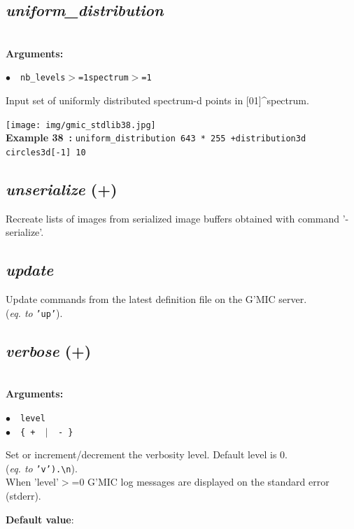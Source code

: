 \documentclass[a4paper,10.5pt,twoside]{book}
\def\comma{\discretionary{,}{}{,}}
\newcommand{\Cb}[1]{\textcolor{cb}{#1}}
\newcommand{\Cc}[1]{\textcolor{cc}{#1}}
\begin{document}
\subsection{\emph{uniform\_distribution} }\vspace*{-0.7em}
~\\\textbf{\Cb{Arguments: }}\begin{flushleft}
{\small \Cb{\hspace*{0.5cm}$\bullet$~~\texttt{nb\_levels$>$=1{\comma}spectrum$>$=1}}}\end{flushleft}
Input set of uniformly distributed spectrum-d points in [0{\comma}1]\textasciicircum spectrum.
\begin{center}\texttt{[image: img/gmic\_stdlib38.jpg]}\\
{\footnotesize \textbf{Example 38~:} \texttt{uniform\_distribution 64{\comma}3 * 255 +distribution3d circles3d[-1] 10}}
\end{center}

\subsection{\emph{unserialize} (+)}\vspace*{-0.7em}
Recreate lists of images from serialized image buffers{\comma} obtained with command '-serialize'.


\subsection{\emph{update} }\vspace*{-0.7em}
Update commands from the latest definition file on the G'MIC server.
~\\(\emph{eq. to} {\small \texttt{'up'}}).


\subsection{\emph{verbose} (+)}\vspace*{-0.7em}
~\\\textbf{\Cb{Arguments: }}\begin{flushleft}
{\small \Cb{\hspace*{0.5cm}$\bullet$~~\texttt{level}}}~~~\\
{\small \Cb{\hspace*{0.5cm}$\bullet$~~\texttt{\{ + ~$|$~ - \}}}}\end{flushleft}
Set or increment/decrement the verbosity level. Default level is 0.
~\\(\emph{eq. to} {\small \texttt{'v').\textbackslash n}}).
~\\When 'level'$>$=0{\comma} G'MIC log messages are displayed on the standard error (stderr).
\begin{flushleft}\Cc{\textbf{Default value}:\\~\\\hspace*{0.5cm}{\small $\bullet$~~\texttt{'level=0'.}}}\end{flushleft}
\end{document}
